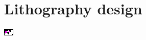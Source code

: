 \section{Lithography design}
\begin{Figure}
    \centering
    \includegraphics[trim=0mm 0.12mm 0.17mm 0mm, clip=true,width=\linewidth]{figures/litho_design.pdf}
    \label{fig:distancea10}
\end{Figure} 